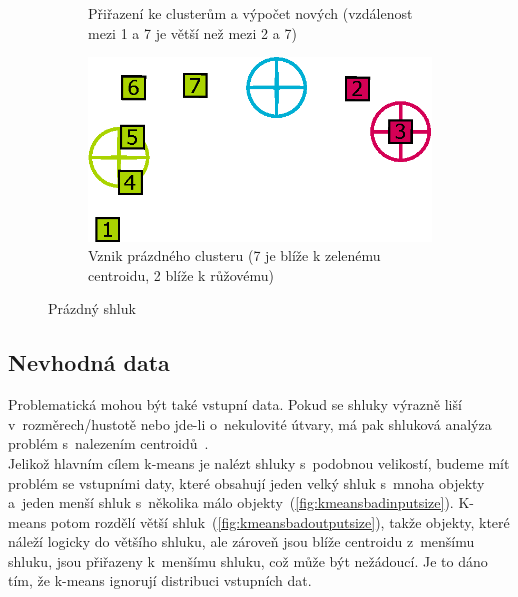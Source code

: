 \begin{figure}[h]
\begin{subfigure}{.49\textwidth}
  \caption{Přiřazení ke clusterům a výpočet nových (vzdálenost mezi 1 a 7 je větší než mezi 2 a 7)}
  \label{fig:kmeansemptycluster3}
\end{subfigure}
\begin{subfigure}{.49\textwidth}
  \centering
  \includegraphics[width=.9\linewidth]{img/kmeans_emptyCluster4.eps}
  \caption{Vznik prázdného clusteru (7 je blíže k zelenému centroidu, 2 blíže k růžovému)}
  \label{fig:kmeansemptycluster4}
\end{subfigure}
\caption{Prázdný shluk}
\label{fig:kmeansemptycluster}
\end{figure}

\subsection{Nevhodná data}
Problematická mohou být také vstupní data. Pokud se shluky výrazně liší v~rozměrech/hustotě nebo jde-li o~nekulovité útvary, má pak shluková analýza problém s~nalezením centroidů~\cite{Tan05}. \\

Jelikož hlavním cílem k-means je nalézt shluky s~podobnou velikostí, budeme mít problém se vstupními daty, které obsahují jeden velký shluk s~mnoha objekty a~jeden menší shluk s~několika málo objekty~(\autoref{fig:kmeansbadinputsize}). K-means potom rozdělí větší shluk~(\autoref{fig:kmeansbadoutputsize}), takže objekty, které náleží logicky do většího shluku, ale zároveň jsou blíže centroidu z~menšímu shluku, jsou přiřazeny k~menšímu shluku, což může být nežádoucí. Je to dáno tím, že k-means ignorují distribuci vstupních dat.

